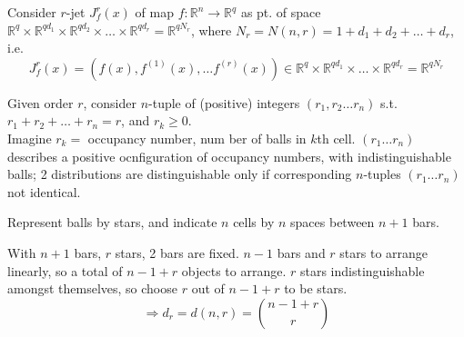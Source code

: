 \documentclass[10pt]{amsart}
\newcommand{\exercisehead}[1]
  { \smallskip
   \noindent{\small\bf Exercise #1.}
  }
\begin{document}
\begin{multicols*}{2}
Consider $r$-jet $J^r_f(x)$ of map $f:\mathbb{R}^n\to \mathbb{R}^q$ as pt. of space $\mathbb{R}^q \times \mathbb{R}^{qd_1} \times \mathbb{R}^{qd_2} \times \dots \times \mathbb{R}^{qd_r} = \mathbb{R}^{q N_r}$, where $N_r = N(n,r) = 1 + d_1 + d_2 + \dots + d_r$, i.e. 
\[
J_f^r(x) = (f(x),f^{(1)}(x) , \dots f^{(r)}(x) ) \in \mathbb{R}^q \times \mathbb{R}^{qd_1} \times  \dots \times \mathbb{R}^{qd_r} = \mathbb{R}^{q N_r}
\]


\exercisehead{1}  

Given order $r$, consider $n$-tuple of (positive) integers $(r_1,r_2\dots r_n)$ s.t. $r_1 + r_2 + \dots + r_n = r$, and $r_k\geq 0$. \\
 Imagine $r_k = $ occupancy number, num ber of balls in $k$th cell.  $(r_1\dots r_n)$ describes a positive ocnfiguration of occupancy numbers, with indistinguishable balls; 2 distributions are distinguishable only if corresponding $n$-tuples $(r_1 \dots r_n)$ not identical.  

Represent balls by stars, and indicate $n$ cells by $n$ spaces between $n+1$ bars.  

With $n+1$ bars, $r$ stars, 2 bars are fixed. $n-1$ bars and $r$ stars to arrange linearly, so a total of $n-1+r$ objects to arrange.  $r$ stars indistinguishable amongst themselves, so choose $r$ out of $n-1+r$ to be stars.  
\begin{equation}
\Longrightarrow d_r = d(n,r)=\binom{n-1+r}{r}
\end{equation}


\end{multicols*}
\end{document}
